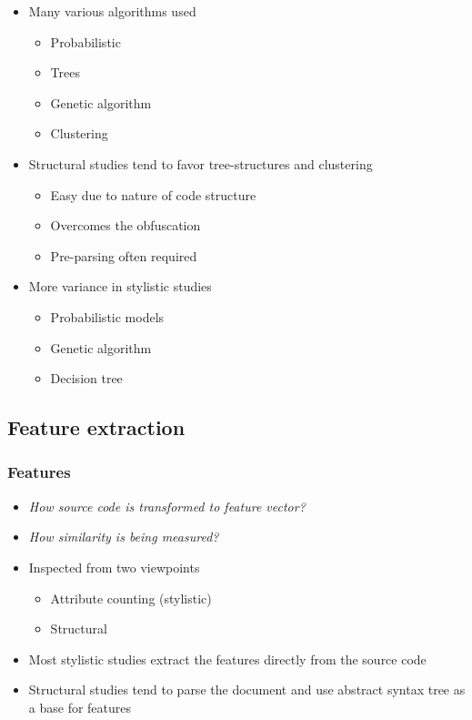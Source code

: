 \documentclass[t,12pt,pdftex]{beamer}
\begin{document}
\begin{frame}
	\vspace{0.5in}
	\begin{itemize}
	\item Many various algorithms used
	\begin{itemize}
		\item Probabilistic 
		\item Trees
		\item Genetic algorithm
		\item Clustering
	\end{itemize}
	\item Structural studies tend to favor tree-structures and clustering
	\begin{itemize}
		\item Easy due to nature of code structure
		\item Overcomes the obfuscation
		\item Pre-parsing often required
	\end{itemize}
	\item More variance in stylistic studies 
	\begin{itemize}
		\item Probabilistic models
		\item Genetic algorithm
		\item Decision tree
	\end{itemize}
	\end{itemize}
\end{frame}

\subsection{Feature extraction}

\begin{frame}
	\frametitle{Features}
	\begin{itemize}
		\item \textit{How source code is transformed to feature vector?}
		\item {\textit{How similarity is being measured?}}
		\item Inspected from two viewpoints
		\begin{itemize}
			\item Attribute counting (stylistic)
			\item Structural
		\end{itemize}
		\item Most stylistic studies extract the features directly from the source code
		\item Structural studies tend to parse the document and use abstract syntax tree as a base for features
	\end{itemize}
\end{frame}
\end{document}
